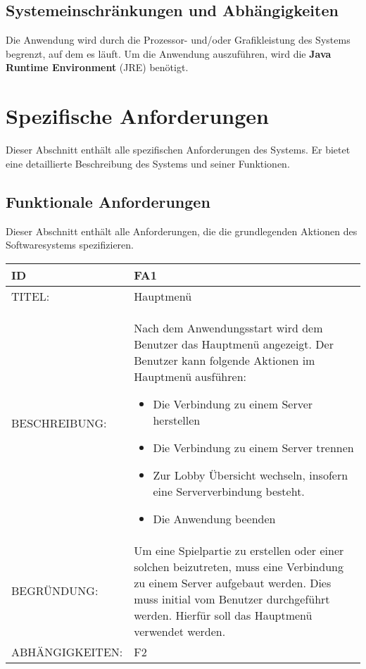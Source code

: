 \documentclass{uulm-assignment}
\begin{document}
\subsection{Systemeinschränkungen und Abhängigkeiten}

Die Anwendung wird durch die Prozessor- und/oder Grafikleistung des Systems begrenzt, auf dem es
läuft. Um die Anwendung auszuführen, wird die \textbf{Java Runtime Environment} (JRE) benötigt.

\section{Spezifische Anforderungen}

Dieser Abschnitt enthält alle spezifischen Anforderungen des Systems. Er bietet eine detaillierte
Beschreibung des Systems und seiner Funktionen.

\subsection{Funktionale Anforderungen}

Dieser Abschnitt enthält alle Anforderungen, die die grundlegenden Aktionen des Softwaresystems
spezifizieren.

\begin{tabularx}{16cm}{l|X}
\textbf{ID} & \textbf{FA1} \\
\hline
TITEL: & Hauptmenü \\
\hline
BESCHREIBUNG: & Nach dem Anwendungsstart wird dem Benutzer das Hauptmenü angezeigt. Der Benutzer kann folgende Aktionen im Hauptmenü ausführen: 
\begin{itemize}
\item Die Verbindung zu einem Server herstellen
\item Die Verbindung zu einem Server trennen
\item Zur Lobby Übersicht wechseln, insofern eine Serververbindung besteht.
\item Die Anwendung beenden
\end{itemize}
\\
\hline
BEGRÜNDUNG: & Um eine Spielpartie zu erstellen oder einer solchen beizutreten, muss eine Verbindung zu einem Server aufgebaut werden. Dies muss initial vom Benutzer durchgeführt werden. Hierfür soll das Hauptmenü verwendet werden.\\
\hline
ABHÄNGIGKEITEN: & F2\\
\end{tabularx}
\end{document}
